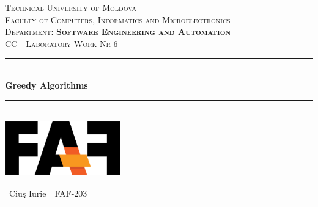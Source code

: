 \documentclass[12pt]{article}
\begin{document}
\newcommand{\HRule}{\rule{\linewidth}{0.2mm}}

\center


\textsc{
    \LARGE Technical University of Moldova
}\\[0cm]

\textsc{
    Faculty of Computers, Informatics and Microelectronics
}\\[0cm]

\textsc{
    Department: \textbf{Software Engineering and Automation}
}\\[4cm]




\textsc{
    \Large CC - Laboratory Work Nr 6
}\\[0cm]




\HRule \\[0.6cm]
{ \huge \bfseries Greedy Algorithms}\\[0.1cm]
\HRule \\[1.5cm]




{\includegraphics[width=5cm]{logo.PNG}}\\[1cm]




\begin{center}
    \begin{tabular}{ c c }
        Ciuş Iurie & FAF-203
    \end{tabular}
\end{center}

\end{document}
